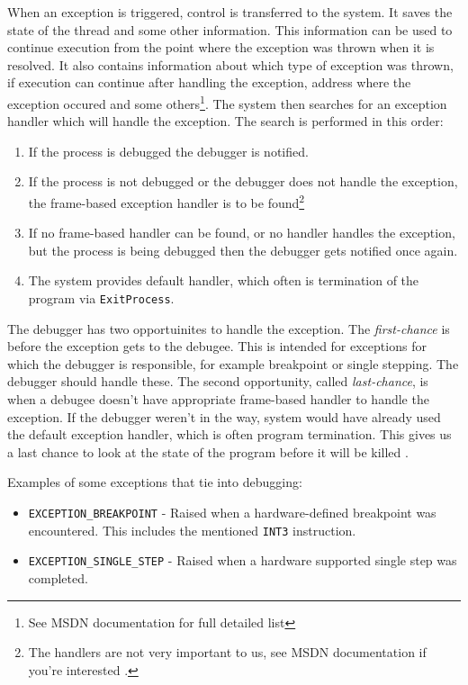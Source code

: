 When an exception is triggered, control is transferred to the system. It saves
the state of the thread and some other information. This information can be
used to continue execution from the point where the exception was thrown when
it is resolved. It also contains information about which type of exception was
thrown, if execution can continue after handling the exception, address where
the exception occured and some others\footnote{See MSDN documentation
\cite{windows-msdn-seh} for full detailed list}. The system then searches for
an exception handler which will handle the exception. The search is performed
in this order:

\begin{enumerate}
    \item If the process is debugged the debugger is notified.
    \item If the process is not debugged or the debugger does not handle the
        exception, the frame-based exception handler is to be
        found\footnote{The handlers are not very important to us, see MSDN
        documentation if you're interested \cite{windows-msdn-seh}.}
    \item If no frame-based handler can be found, or no handler handles the
        exception, but the process is being debugged then the debugger gets
        notified once again.
    \item The system provides default handler, which often is termination of
        the program via \texttt{ExitProcess}.
\end{enumerate}

The debugger has two opportuinites to handle the exception. The
\textit{first-chance} is before the exception gets to the debugee. This is
intended for exceptions for which the debugger is responsible, for example
breakpoint or single stepping. The debugger should handle these. The second
opportunity, called \textit{last-chance}, is when a debugee doesn't have
appropriate frame-based handler to handle the exception. If the debugger
weren't in the way, system would have already used the default exception
handler, which is often program termination. This gives us a last chance to
look at the state of the program before it will be killed
\cite{windows-msdn-dbg-exc-handling}.

Examples of some exceptions that tie into debugging:
\begin{itemize}
    \item \texttt{EXCEPTION\_BREAKPOINT} - Raised when a hardware-defined
        breakpoint was encountered. This includes the mentioned
        \texttt{INT3} instruction.
    \item \texttt{EXCEPTION\_SINGLE\_STEP} - Raised when a hardware supported
        single step was completed.
\end{itemize}

